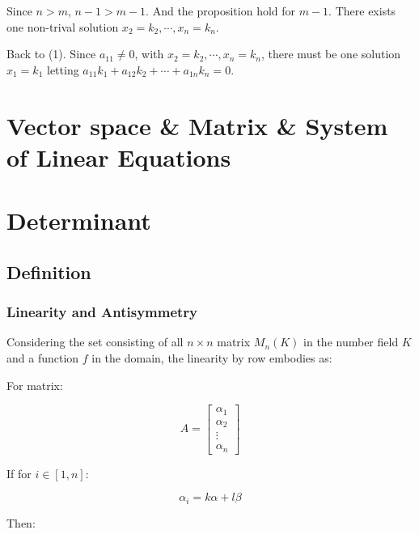 \documentclass{article}
\begin{document}
Since \(n>m\), \(n-1>m-1\). And the proposition hold for \(m-1\). There
exists one non-trival solution \(x_2=k_2, \cdots, x_n=k_n\).

Back to (1). Since \(a_{11} \neq 0\), with
\(x_2=k_2, \cdots, x_n=k_n\), there must be one solution \(x_1=k_1\)
letting \(a_{11}k_1+a_{12}k_2+\cdots+a_{1n}k_n=0\).

\section{Vector space \& Matrix \& System of Linear Equations}

\section{Determinant}

\subsection{Definition}

\subsubsection{Linearity and Antisymmetry}

Considering the set consisting of all 
\(n \times n\) matrix \(M_n(K)\) in the number field \(K\) and
a function \(f\) in the domain,
the linearity by row embodies as:

For matrix:

\begin{equation*}
A=
\begin{bmatrix}
    \alpha_1 \\
    \alpha_2 \\
    \vdots \\
    \alpha_n
\end{bmatrix}
\end{equation*}

If for \(i \in [1, n]\):

\begin{equation*}
    \alpha_i=k\alpha+l\beta
\end{equation*}

Then:
\end{document}

